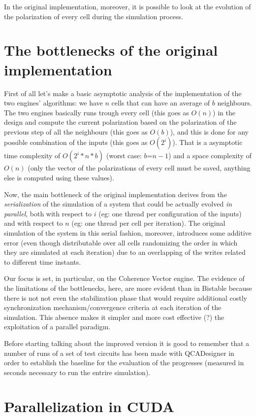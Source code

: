 In the original implementation, moreover, it is possible to look at the evolution of the polarization of every cell during the simulation process.
\section {The bottlenecks of the original implementation}
First of all let's make a basic asymptotic analysis of the implementation of the two engines' algorithms: we have $n$ cells that can have an average of $b$ neighbours. The two engines basically runs trough every cell (this goes as $O(n)$) in the design and compute the current polarization based on the polarization of the previous step of all the neighbours (this goes as $O(b)$), and this is done for any possible combination of the inputs (this goes as $O(2^i)$). That is a asymptotic time complexity of $O(2^i*n*b)$  (worst case: $b$=$n-1$) and a space complexity of $O(n)$ (only the vector of the polarizations of every cell must be saved, anything else is computed using these values).

Now, the main bottleneck of the original implementation derives from the \textsl{serialization} of the simulation of a system that could be actually evolved \textsl{in parallel}, both with respect to $i$ (eg: one thread per configuration of the inputs) and with respect to $n$ (eg: one thread per cell per iteration). The original simulation of the system in this serial fashion, moreover, introduces some additive error (even though distributable over all cells randomizing the order in which they are simulated at each iteration) due to an overlapping of the writes related to different time instants. 

Our focus is set, in particular, on the Coherence Vector engine. The evidence of the limitations of the bottlenecks, here, are more evident than in Bistable because there is not not even the stabilization phase that would require additional costly synchronization mechanism/convergence criteria at each iteration of the simulation. This absence makes it simpler and more cost effective (?) the exploitation of a parallel paradigm.

Before starting talking about the improved version it is good to remember that a number of runs of a set of test circuits has been made with QCADesigner in order to establish the baseline for the evaluation of the progresses (measured in seconds necessary to run the entrire simulation).
\section {Parallelization in CUDA}
